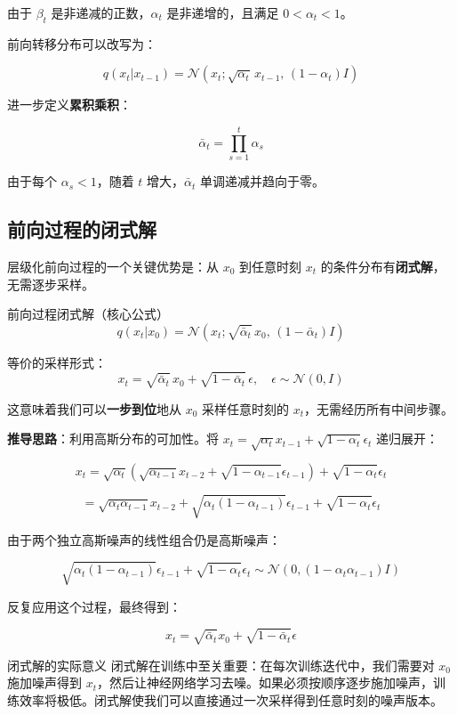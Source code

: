 由于 $\beta_t$ 是非递减的正数，$\alpha_t$ 是非递增的，且满足 $0 < \alpha_t < 1$。

前向转移分布可以改写为：

$$q(x_t | x_{t-1}) = \mathcal{N}(x_t; \sqrt{\alpha_t} \, x_{t-1}, \, (1 - \alpha_t) I)$$

进一步定义\textbf{累积乘积}：

$$\bar{\alpha}_t = \prod_{s=1}^{t} \alpha_s$$

由于每个 $\alpha_s < 1$，随着 $t$ 增大，$\bar{\alpha}_t$ 单调递减并趋向于零。

\subsection{前向过程的闭式解}

层级化前向过程的一个关键优势是：从 $x_0$ 到任意时刻 $x_t$ 的条件分布有\textbf{闭式解}，无需逐步采样。

\begin{importantbox}{前向过程闭式解（核心公式）}
$$q(x_t | x_0) = \mathcal{N}(x_t; \sqrt{\bar{\alpha}_t} \, x_0, \, (1 - \bar{\alpha}_t) I)$$

等价的采样形式：
$$x_t = \sqrt{\bar{\alpha}_t} \, x_0 + \sqrt{1 - \bar{\alpha}_t} \, \epsilon, \quad \epsilon \sim \mathcal{N}(0, I)$$

这意味着我们可以\textbf{一步到位}地从 $x_0$ 采样任意时刻的 $x_t$，无需经历所有中间步骤。
\end{importantbox}

\textbf{推导思路}：利用高斯分布的可加性。将 $x_t = \sqrt{\alpha_t} x_{t-1} + \sqrt{1-\alpha_t} \epsilon_t$ 递归展开：

$$x_t = \sqrt{\alpha_t} (\sqrt{\alpha_{t-1}} x_{t-2} + \sqrt{1-\alpha_{t-1}} \epsilon_{t-1}) + \sqrt{1-\alpha_t} \epsilon_t$$

$$= \sqrt{\alpha_t \alpha_{t-1}} x_{t-2} + \sqrt{\alpha_t(1-\alpha_{t-1})} \epsilon_{t-1} + \sqrt{1-\alpha_t} \epsilon_t$$

由于两个独立高斯噪声的线性组合仍是高斯噪声：

$$\sqrt{\alpha_t(1-\alpha_{t-1})} \epsilon_{t-1} + \sqrt{1-\alpha_t} \epsilon_t \sim \mathcal{N}(0, (1-\alpha_t\alpha_{t-1}) I)$$

反复应用这个过程，最终得到：

$$x_t = \sqrt{\bar{\alpha}_t} x_0 + \sqrt{1-\bar{\alpha}_t} \epsilon$$

\begin{knowledgebox}{闭式解的实际意义}
闭式解在训练中至关重要：在每次训练迭代中，我们需要对 $x_0$ 施加噪声得到 $x_t$，然后让神经网络学习去噪。如果必须按顺序逐步施加噪声，训练效率将极低。闭式解使我们可以直接通过一次采样得到任意时刻的噪声版本。
\end{knowledgebox}

